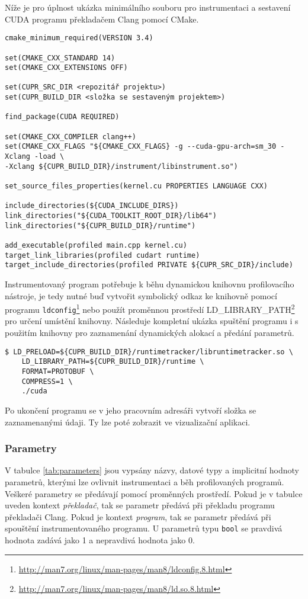 Níže je pro úplnost ukázka minimálního souboru pro instrumentaci a sestavení CUDA programu překladačem Clang pomocí CMake.


\begin{verbatim}
cmake_minimum_required(VERSION 3.4)

set(CMAKE_CXX_STANDARD 14)
set(CMAKE_CXX_EXTENSIONS OFF)

set(CUPR_SRC_DIR <repozitář projektu>)
set(CUPR_BUILD_DIR <složka se sestaveným projektem>)

find_package(CUDA REQUIRED)

set(CMAKE_CXX_COMPILER clang++)
set(CMAKE_CXX_FLAGS "${CMAKE_CXX_FLAGS} -g --cuda-gpu-arch=sm_30 -Xclang -load \
-Xclang ${CUPR_BUILD_DIR}/instrument/libinstrument.so")

set_source_files_properties(kernel.cu PROPERTIES LANGUAGE CXX)

include_directories(${CUDA_INCLUDE_DIRS})
link_directories("${CUDA_TOOLKIT_ROOT_DIR}/lib64")
link_directories("${CUPR_BUILD_DIR}/runtime")

add_executable(profiled main.cpp kernel.cu)
target_link_libraries(profiled cudart runtime)
target_include_directories(profiled PRIVATE ${CUPR_SRC_DIR}/include)
\end{verbatim}


Instrumentovaný program potřebuje k běhu dynamickou knihovnu profilovacího nástroje, je tedy nutné buď vytvořit symbolický odkaz ke knihovně pomocí programu \texttt{ldconfig}\footnote{\url{http://man7.org/linux/man-pages/man8/ldconfig.8.html}} nebo použít proměnnou prostředí LD\_LIBRARY\_PATH\footnote{\url{http://man7.org/linux/man-pages/man8/ld.so.8.html}} pro určení umístění knihovny. Následuje kompletní ukázka spuštění programu i s použitím knihovny pro zaznamenání dynamických alokací a předání parametrů.

\begin{verbatim}
$ LD_PRELOAD=${CUPR_BUILD_DIR}/runtimetracker/libruntimetracker.so \
    LD_LIBRARY_PATH=${CUPR_BUILD_DIR}/runtime \
    FORMAT=PROTOBUF \
    COMPRESS=1 \
    ./cuda
\end{verbatim}

Po ukončení programu se v jeho pracovním adresáři vytvoří složka se zaznamenanými údaji. Ty lze poté zobrazit ve vizualizační aplikaci.

\subsubsection{Parametry}
\label{manual:parameters}
V tabulce \ref{tab:parameters} jsou vypsány názvy, datové typy a implicitní hodnoty parametrů, kterými lze ovlivnit instrumentaci a běh profilovaných programů. Veškeré parametry se předávají pomocí proměnných prostředí. Pokud je v tabulce uveden kontext \emph{překladač}, tak se parametr předává při překladu programu překladači Clang. Pokud je kontext \emph{program}, tak se parametr předává při spouštění instrumentovaného programu. U parametrů typu \texttt{bool} se pravdivá hodnota zadává jako 1 a nepravdivá hodnota jako 0.

